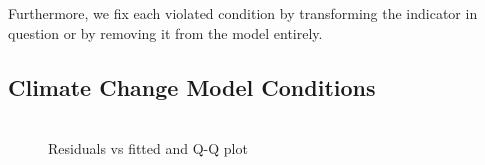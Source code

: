 \documentclass[12pt]{article}
\begin{document}
Furthermore, we fix each violated condition by transforming the indicator in question or by removing it from the model entirely.

\subsection{Climate Change Model Conditions}


\begin{figure}[h!]
  \centering
  \includegraphics[width=\textwidth]{images/climate_model_conditions}
  \caption{\label{climate_model_conditions}Residuals vs fitted and Q-Q plot}
\end{figure}
\end{document}
